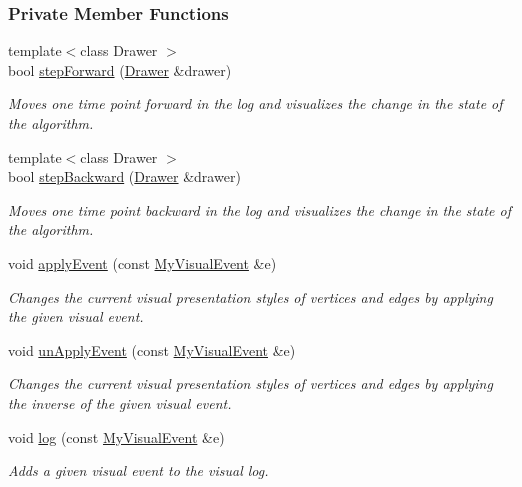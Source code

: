 \subsubsection*{Private Member Functions}
\begin{DoxyCompactItemize}
\item 
{\footnotesize template$<$class Drawer $>$ }\\bool \hyperlink{structslb_1_1core_1_1ui_1_1VisualLog_a3ec4295dbd6e592cfd0fd9311b7b7aa4}{step\+Forward} (\hyperlink{structslb_1_1core_1_1ui_1_1Drawer}{Drawer} \&drawer)
\begin{DoxyCompactList}\small\item\em Moves one time point forward in the log and visualizes the change in the state of the algorithm. \end{DoxyCompactList}\item 
{\footnotesize template$<$class Drawer $>$ }\\bool \hyperlink{structslb_1_1core_1_1ui_1_1VisualLog_aa1d1e634a5659eceeb9fbd9fd3495946}{step\+Backward} (\hyperlink{structslb_1_1core_1_1ui_1_1Drawer}{Drawer} \&drawer)
\begin{DoxyCompactList}\small\item\em Moves one time point backward in the log and visualizes the change in the state of the algorithm. \end{DoxyCompactList}\item 
void \hyperlink{structslb_1_1core_1_1ui_1_1VisualLog_a46d23ffa07d8ecfad8561b8bf1527cd9}{apply\+Event} (const \hyperlink{structslb_1_1core_1_1ui_1_1VisualLog_a6c09f9d1c9f6159c6a151a2795b5295e}{My\+Visual\+Event} \&e)
\begin{DoxyCompactList}\small\item\em Changes the current visual presentation styles of vertices and edges by applying the given visual event. \end{DoxyCompactList}\item 
void \hyperlink{structslb_1_1core_1_1ui_1_1VisualLog_ae2b12c5549070393e9846e91f5cf9e92}{un\+Apply\+Event} (const \hyperlink{structslb_1_1core_1_1ui_1_1VisualLog_a6c09f9d1c9f6159c6a151a2795b5295e}{My\+Visual\+Event} \&e)
\begin{DoxyCompactList}\small\item\em Changes the current visual presentation styles of vertices and edges by applying the inverse of the given visual event. \end{DoxyCompactList}\item 
void \hyperlink{structslb_1_1core_1_1ui_1_1VisualLog_aba8162dcd351b18846b8a1aec03bbc64}{log} (const \hyperlink{structslb_1_1core_1_1ui_1_1VisualLog_a6c09f9d1c9f6159c6a151a2795b5295e}{My\+Visual\+Event} \&e)
\begin{DoxyCompactList}\small\item\em Adds a given visual event to the visual log. \end{DoxyCompactList}\end{DoxyCompactItemize}
